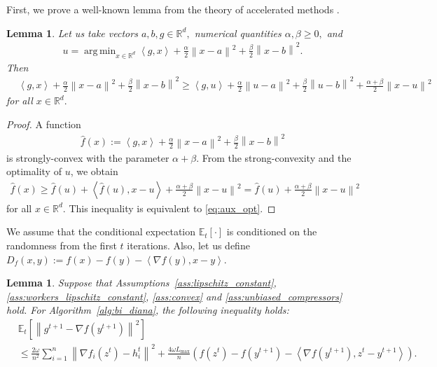 \documentclass{article} %
\newcommand{\norm}[1]{\left\| #1 \right\|}
\newcommand{\inp}[2]{\left\langle#1,#2\right\rangle} %
\newcommand{\R}{\mathbb{R}} %
\newcommand{\ExpSub}[2]{{\mathbb{E}}_{#1}\left[#2\right]}
\theoremstyle{plain}
\newtheorem{lemma}[theorem]{Lemma}
\theoremstyle{definition}
\theoremstyle{remark}
\newcommand{\eqdef}{:=}
\DeclareMathOperator*{\argmin}{arg\,min}%
\begin{document}
First, we prove a well-known lemma from the theory of accelerated methods \citep{lan2020first, stonyakin2021inexact}.
\begin{lemma}
  \label{lemma:aux_opt}
  Let us take vectors $a, b, g \in \R^d,$ numerical quantities $\alpha, \beta \geq 0,$ and
  \begin{align*}
    u = \argmin_{x \in \R^d} \inp{g}{x} + \frac{\alpha}{2} \norm{x - a}^2 + \frac{\beta}{2} \norm{x - b}^2.
  \end{align*}
  Then
  \begin{align}
    \label{eq:aux_opt}
    &\inp{g}{x} + \frac{\alpha}{2} \norm{x - a}^2 + \frac{\beta}{2} \norm{x - b}^2 \geq \inp{g}{u} + \frac{\alpha}{2} \norm{u - a}^2 + \frac{\beta}{2} \norm{u - b}^2 + \frac{\alpha + \beta}{2} \norm{x - u}^2
  \end{align}
  for all $x \in \R^d.$
\end{lemma}

\begin{proof}
  A function 
  \begin{align*}
    \widehat{f}(x) \eqdef \inp{g}{x} + \frac{\alpha}{2} \norm{x - a}^2 + \frac{\beta}{2} \norm{x - b}^2
  \end{align*}
  is strongly-convex with the parameter $\alpha + \beta.$ From the strong-convexity and the optimality of $u$, we obtain
  \begin{align*}
    \widehat{f}(x) \geq \widehat{f}(u) + \inp{\widehat{f}(u)}{x - u} + \frac{\alpha + \beta}{2} \norm{x - u}^2 = \widehat{f}(u) + \frac{\alpha + \beta}{2} \norm{x - u}^2
  \end{align*}
  for all $x \in \R^d.$
  This inequality is equivalent to \eqref{eq:aux_opt}.
\end{proof}

We assume that the conditional expectation $\ExpSub{t}{\cdot}$ is conditioned on the randomness from the first $t$ iterations. Also, let us define $D_f(x, y) \eqdef f(x) - f(y) - \inp{\nabla f(y)}{x - y}.$

\begin{lemma}
  \label{lemma:aux_stoch_grad}
  Suppose that Assumptions~\ref{ass:lipschitz_constant}, \ref{ass:workers_lipschitz_constant}, \ref{ass:convex} and \ref{ass:unbiased_compressors} hold. For Algorithm~\ref{alg:bi_diana}, the following inequality holds:
  \begin{equation}
    \begin{aligned}
      \label{eq:nabla_g_f}
    &\ExpSub{t}{\norm{g^{t+1} - \nabla f(y^{t+1})}^2} \\ 
    &\leq\frac{2 \omega}{n^2} \sum_{i=1}^n \norm{\nabla f_i(z^{t}) - h_i^t}^2 + \frac{4 \omega L_{\max}}{n} (f(z^t) - f(y^{t+1}) - \inp{\nabla f(y^{t+1})}{z^t - y^{t+1}}).
  \end{aligned}
  \end{equation}
\end{lemma}
\end{document}
